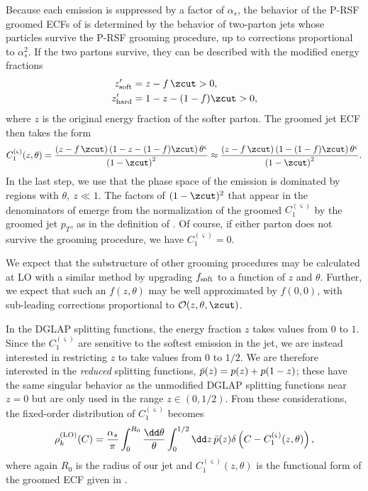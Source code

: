 \documentclass[letterpaper,11pt]{article}
\begin{document}
Because each emission is suppressed by a factor of \(\alpha_s\), the behavior of the P-RSF groomed ECFs of  is determined by the behavior of two-parton jets whose particles survive the P-RSF grooming procedure, up to corrections proportional to \(\alpha_s^2\).
%
If the two partons survive, they can be described with the modified energy fractions
\begin{align}
    z_{\rm soft}' &= z - f\,\zcut > 0,
    \\
    z_{\rm hard}' &= 1 - z - (1-f)\zcut > 0,
\end{align}
where \(z\) is the original energy fraction of the softer parton.
%
The groomed jet ECF then takes the form
\begin{equation}
    C_1^{(\varsigma)}(z,\theta)
    =
    \frac{\left(z - f\,\zcut\right)\left(1 - z - (1-f)\zcut\right)\theta^\varsigma}{\left(1 - \zcut\right)^2}
    \approx
    \frac{\left(z - f\,\zcut\right)\left(1 - (1-f)\zcut\right)\theta^\varsigma}{\left(1 - \zcut\right)^2}
    \label{eqn:oneEm_groomedECFdefn}
    .
\end{equation}
In the last step, we use that the phase space of the emission is dominated by regions with \(\theta,~z \ll 1\).
%
The factors of \((1-\zcut)^2\) that appear in the denominators of  emerge from the normalization of the groomed \(C_1^{(\varsigma)}\) by the groomed jet \(p_T\), as in the definition of .
%
Of course, if either parton does not survive the grooming procedure, we have \(C_1^{(\varsigma)} = 0\).

We expect that the substructure of other \PIRANHA{} grooming procedures may be calculated at LO with a similar method by upgrading \(f_{\rm soft}\) to a function of \(z\) and \(\theta\).
%
Further, we expect that such an \(f(z, \theta)\) may be well approximated by \(f(0,0)\), with sub-leading corrections proportional to \(\mathcal{O}(z, \theta, \zcut)\).

In the DGLAP splitting functions, the energy fraction \(z\) takes values from \(0\) to \(1\).
%
Since the \(C_1^{(\varsigma)}\) are sensitive to the softest emission in the jet, we are instead interested in restricting \(z\) to take values from \(0\) to \(1/2\).
%
We are therefore interested in the \textit{reduced} splitting functions, \(\Bar{p}(z) = p(z) + p(1-z)\);
%
these have the same singular behavior as the unmodified DGLAP splitting functions near \(z = 0\) but are only used in the range \(z\in(0, 1/2)\).
%
From these considerations, the fixed-order distribution of \(C_1^{(\varsigma)}\) becomes
%
\begin{align}
    \rho^{\rm(LO)}_{k}(C)
    =
    \frac{\alpha_s}{\pi}\int_0^{R_0}\frac{\dd\theta}{\theta}
    \int_0^{1/2} \dd z\, \Bar{p}(z)
    \delta\left(C - C_1^{(\varsigma)}(z,\theta)\right),
    \label{eqn:LO_dist_setup}
\end{align}
%
where again \(R_0\) is the radius of our jet and \(C_1^{(\varsigma)}(z,\theta)\) is the functional form of the groomed ECF given in .
\end{document}
